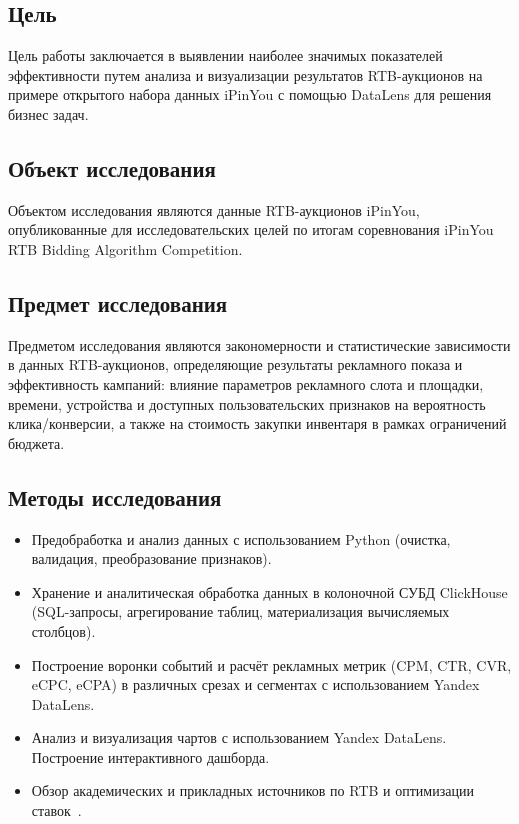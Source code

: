 \subsection{Цель}
Цель работы заключается в выявлении наиболее значимых показателей эффективности путем анализа и визуализации результатов RTB-аукционов на примере открытого набора данных iPinYou с помощью DataLens для решения бизнес задач.

\subsection{Объект исследования}
Объектом исследования являются данные RTB-аукционов iPinYou, опубликованные для исследовательских целей по итогам соревнования iPinYou RTB Bidding Algorithm Competition.

\subsection{Предмет исследования}
Предметом исследования являются закономерности и статистические зависимости в данных RTB-аукционов, определяющие результаты рекламного показа и эффективность кампаний: влияние параметров рекламного слота и площадки, времени, устройства и доступных пользовательских признаков на вероятность клика/конверсии, а также на стоимость закупки инвентаря в рамках ограничений бюджета.

\subsection{Методы исследования}
\begin{itemize}
    \item Предобработка и анализ данных с использованием Python (очистка, валидация, преобразование признаков).
    \item Хранение и аналитическая обработка данных в колоночной СУБД ClickHouse (SQL-запросы, агрегирование таблиц, материализация вычисляемых столбцов).
    \item Построение воронки событий и расчёт рекламных метрик (CPM, CTR, CVR, eCPC, eCPA) в различных срезах и сегментах с использованием Yandex DataLens.
    \item Анализ и визуализация чартов с использованием Yandex DataLens. Построение интерактивного дашборда.
    \item Обзор академических и прикладных источников по RTB и оптимизации ставок~\cite{rtb-research, rtb-benchmarking}.
\end{itemize}

